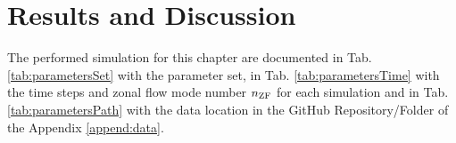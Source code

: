 
\chapter{Results and Discussion}
\label{chap:results}

The performed simulation for this chapter are documented in Tab. \ref{tab:parametersSet} with the parameter set, in Tab. \ref{tab:parametersTime} with the time steps and zonal flow mode number $n_\mathrm{ZF}$ for each simulation and in Tab. \ref{tab:parametersPath} with the data location in the GitHub Repository/Folder of the Appendix \ref{append:data}.